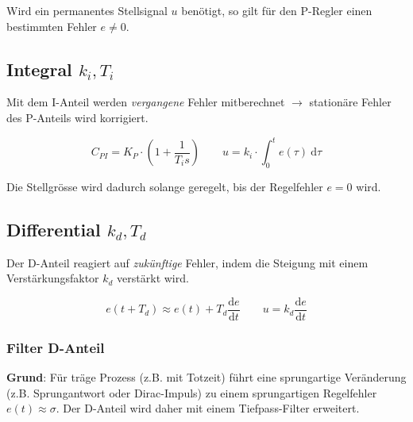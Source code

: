 \documentclass[
  10pt,
  a4paper,
]{article}
\numberwithin{equation}{section}
\begin{document}
\begin{multicols}{2}
\begin{tcolorbox}[enhanced jigsaw, coltitle=black, arc=.35mm, breakable, opacityback=0, opacitybacktitle=0.6, rightrule=.15mm, titlerule=0mm, bottomrule=.15mm, leftrule=.75mm, bottomtitle=1mm, colframe=quarto-callout-caution-color-frame, toprule=.15mm, colbacktitle=quarto-callout-caution-color!10!white, toptitle=1mm, title=\textcolor{quarto-callout-caution-color}{\faFire}\hspace{0.5em}{Permanentes Stellsignal \(u\)}, left=2mm, colback=white]

Wird ein permanentes Stellsignal \(u\) benötigt, so gilt für den
P-Regler einen bestimmten Fehler \(e \neq 0\).

\end{tcolorbox}

\hypertarget{k_it_i}{%
\subsection{\texorpdfstring{\textcolor{NavyBlue}{Integral}
\(k_i,T_i\)}{ k\_i,T\_i}}\label{k_it_i}}

Mit dem I-Anteil werden \emph{vergangene} Fehler mitberechnet
\(\rightarrow\) stationäre Fehler des P-Anteils wird korrigiert.

\[
C_{PI}=K_P\cdot\left(1+\frac1{T_i s}\right)\qquad u = k_i\cdot\int_0^t e(\tau)\ {\text{d}\tau}
\]

Die Stellgrösse wird dadurch solange geregelt, bis der Regelfehler
\(e=0\) wird.

\hypertarget{k_dt_d}{%
\subsection{\texorpdfstring{\textcolor{OliveGreen}{Differential}
\(k_d,T_d\)}{ k\_d,T\_d}}\label{k_dt_d}}

Der D-Anteil reagiert auf \emph{zukünftige} Fehler, indem die Steigung
mit einem Verstärkungsfaktor \(k_d\) verstärkt wird.

\[
e(t+T_d)\approx e(t)+T_d \frac{\text{d}e}{\text{d}t} \qquad u = k_d \frac{\text{d}e}{\text{d}t}
\]

\hypertarget{filter-d-anteil}{%
\subsubsection{Filter D-Anteil}\label{filter-d-anteil}}

\textbf{Grund}: Für träge Prozess (z.B. mit Totzeit) führt eine
sprungartige Veränderung (z.B. Sprungantwort oder Dirac-Impuls) zu einem
sprungartigen Regelfehler \(e(t)\approx \sigma\). Der D-Anteil wird
daher mit einem Tiefpass-Filter erweitert.


\end{multicols}
\end{document}
